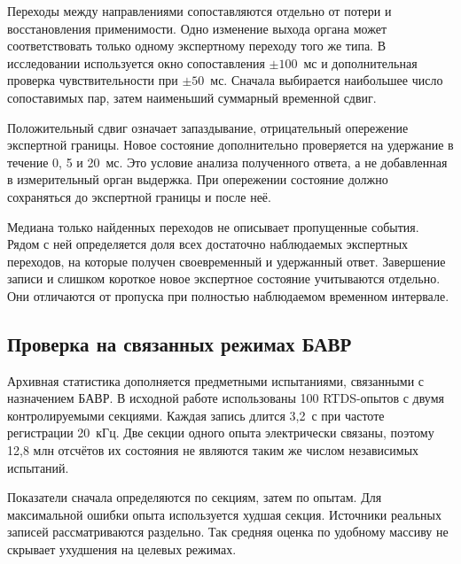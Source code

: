 Переходы между направлениями сопоставляются
отдельно от потери и восстановления применимости.
Одно изменение выхода органа может соответствовать
только одному экспертному переходу того же типа.
В исследовании используется окно сопоставления
$\pm100$~мс и дополнительная проверка
чувствительности при $\pm50$~мс.
Сначала выбирается наибольшее число сопоставимых пар,
затем наименьший суммарный временной сдвиг.

Положительный сдвиг означает запаздывание,
отрицательный опережение экспертной границы.
Новое состояние дополнительно проверяется
на удержание в течение 0, 5 и 20~мс.
Это условие анализа полученного ответа,
а не добавленная в измерительный орган выдержка.
При опережении состояние должно сохраняться
до экспертной границы и после неё.

Медиана только найденных переходов
не описывает пропущенные события.
Рядом с ней определяется доля всех достаточно
наблюдаемых экспертных переходов, на которые
получен своевременный и удержанный ответ.
Завершение записи и слишком короткое новое
экспертное состояние учитываются отдельно.
Они отличаются от пропуска при полностью
наблюдаемом временном интервале.

\subsection{Проверка на связанных режимах БАВР}

{}

Архивная статистика дополняется предметными
испытаниями, связанными с назначением БАВР.
В исходной работе использованы 100 RTDS-опытов
с двумя контролируемыми секциями.
Каждая запись длится 3,2~с
при частоте регистрации 20~кГц.
Две секции одного опыта электрически связаны,
поэтому 12,8 млн отсчётов их состояния
не являются таким же числом независимых испытаний.

Показатели сначала определяются по секциям,
затем по опытам. Для максимальной ошибки
опыта используется худшая секция.
Источники реальных записей рассматриваются раздельно.
Так средняя оценка по удобному массиву
не скрывает ухудшения на целевых режимах.

